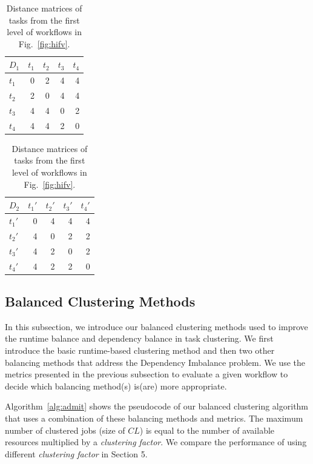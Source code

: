 \begin{table}[htb]
	\footnotesize
	\centering
	\begin{tabular}{l|rrrr}
		$D_1$ & $t_1$ & $t_2$ & $t_3$ &$t_4$\\
		\hline
		$t_1$ & 0 & 2 & 4 & 4 \\
		$t_2$ & 2 & 0 & 4 & 4 \\
		$t_3$ & 4 & 4 & 0 & 2\\
		$t_4$ & 4 & 4 & 2 & 0 \\
	\end{tabular}
	\quad
	\begin{tabular}{l|rrrr}
		$D_2$ & $t_1'$ & $t_2'$ & $t_3'$ &$t_4'$\\
		\hline
		$t_1'$ & 0 & 4 & 4 & 4 \\
		$t_2'$ & 4 & 0 & 2 & 2 \\
		$t_3'$ & 4 & 2 & 0 & 2\\
		$t_4'$ & 4 & 2 & 2 & 0 \\
	\end{tabular}
	\caption{Distance matrices of tasks from the first level of workflows in Fig.~\ref{fig:hifv}.}
	\label{tab:1}
	\vspace{-20pt}
\end{table}


\subsection{Balanced Clustering Methods}
\label{sec:methods}
In this subsection, we introduce our balanced clustering methods used to improve the runtime balance and dependency balance in task clustering. We first introduce the basic runtime-based clustering method and then two other balancing methods that address the Dependency Imbalance problem. We use the metrics presented in the previous subsection to evaluate a given workflow to decide which balancing method(s) is(are) more appropriate. 

Algorithm~\ref{alg:admit} shows the pseudocode of our balanced clustering algorithm that uses a combination of these balancing methods and metrics.  The maximum number of clustered jobs (size of $CL$) is equal to the number of available resources multiplied by a \emph{clustering factor}. We compare the performance of using different \emph{clustering factor} in Section 5. 

